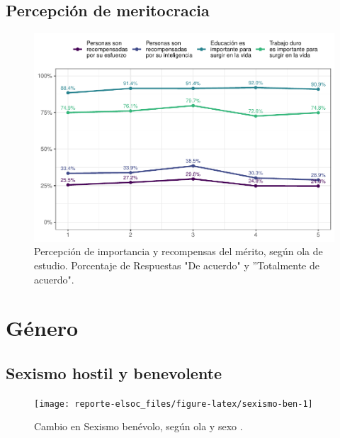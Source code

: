 \documentclass[
  12pt,
  openany]{book}
\begin{document}
\hypertarget{percepciuxf3n-de-meritocracia}{%
\section{Percepción de meritocracia}\label{percepciuxf3n-de-meritocracia}}

\begin{figure}

{\centering \includegraphics{reporte-elsoc_files/figure-latex/merit-wave-1} 

}

\caption{Percepción de importancia y recompensas del mérito, según ola de estudio. Porcentaje de Respuestas "De acuerdo" y ”Totalmente de acuerdo".}\label{fig:merit-wave}
\end{figure}

\hypertarget{guxe9nero}{%
\chapter{Género}\label{guxe9nero}}

\hypertarget{sexismo-hostil-y-benevolente}{%
\section{Sexismo hostil y benevolente}\label{sexismo-hostil-y-benevolente}}

\begin{figure}

{\centering \texttt{[image: reporte-elsoc\_files/figure-latex/sexismo-ben-1]} 

}

\caption{Cambio en Sexismo benévolo, según ola y sexo .}\label{fig:sexismo-ben}
\end{figure}
\end{document}
